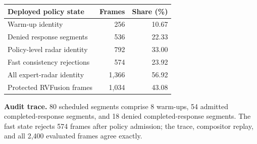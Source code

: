 \par\smallskip\noindent
\begin{minipage}{\columnwidth}
\centering
\small
\captionsetup{hypcap=false}
\label{tab:policy-contract-audit}
\setlength{\tabcolsep}{3pt}
\begin{tabular*}{\columnwidth}{@{\extracolsep{\fill}}lrr@{}}
\toprule
Deployed policy state & Frames & Share (\%) \\
\midrule
Warm-up identity & 256 & 10.67 \\
Denied response segments & 536 & 22.33 \\
Policy-level radar identity & 792 & 33.00 \\
Fast consistency rejections & 574 & 23.92 \\
All expert-radar identity & 1,366 & 56.92 \\
Protected RVFusion frames & 1,034 & 43.08 \\
\bottomrule
\end{tabular*}
\par\vspace{4pt}
\begin{minipage}{\columnwidth}
\footnotesize\raggedright
\textbf{Audit trace.} 80 scheduled segments comprise 8 warm-ups, 54 admitted completed-response segments, and 18 denied completed-response segments. The fast state rejects 574 frames after policy admission; the trace, compositor replay, and all 2,400 evaluated frames agree exactly.
\end{minipage}
\end{minipage}
\par\smallskip
